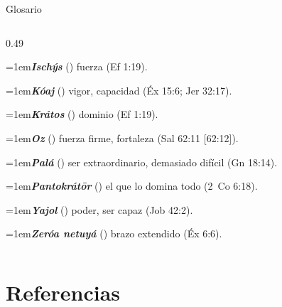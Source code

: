 \begin{frame}{Glosario}
\begin{columns}[t,onlytextwidth]
\begin{column}{0.49\textwidth}
\par\noindent\hangindent=1em{\color{azul}\textbf{\emph{Ischýs}}} () fuerza (Ef 1:19).\par\vspace{2pt}
\par\noindent\hangindent=1em{\color{azul}\textbf{\emph{Kóaj}}} () vigor, capacidad (Éx 15:6; Jer 32:17).\par\vspace{2pt}
\par\noindent\hangindent=1em{\color{azul}\textbf{\emph{Krátos}}} () dominio (Ef 1:19).\par\vspace{2pt}
\par\noindent\hangindent=1em{\color{azul}\textbf{\emph{Oz}}} () fuerza firme, fortaleza (Sal 62:11 [62:12]).\par\vspace{2pt}
\par\noindent\hangindent=1em{\color{azul}\textbf{\emph{Palá}}} () ser extraordinario, demasiado difícil (Gn 18:14).\par\vspace{2pt}
\par\noindent\hangindent=1em{\color{azul}\textbf{\emph{Pantokrátōr}}} () el que lo domina todo (2~Co 6:18).\par\vspace{2pt}
\par\noindent\hangindent=1em{\color{azul}\textbf{\emph{Yajol}}} () poder, ser capaz (Job 42:2).\par\vspace{2pt}
\par\noindent\hangindent=1em{\color{azul}\textbf{\emph{Zeróa netuyá}}} () brazo extendido (Éx 6:6).\par\vspace{2pt}

\end{column}
\end{columns}
\end{frame}

\section{Referencias}

